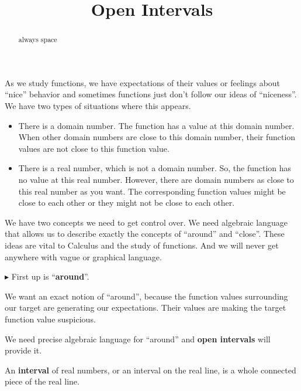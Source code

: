 \documentclass{ximera}
\title{Open Intervals}
\begin{document}
\begin{abstract}
always space
\end{abstract}
\maketitle




As we study functions, we have expectations of their values or feelings about ``nice'' behavior and sometimes functions just don't follow our ideas of ``niceness''.  We have two types of situations where this appears.

\begin{itemize}
\item There is a domain number. The function has a value at this domain number. When other domain numbers are close to this domain number, their function values are not close to this function value.
\item There is a real number, which is not a domain number. So, the function has no value at this real number. However, there are domain numbers as close to this real number as you want. The corresponding function values might be close to each other or they might not be close to each other.
\end{itemize}


We have two concepts we need to get control over. We need algebraic language that allows us to describe exactly the concepts of ``around'' and ``close''.  These ideas are vital to Calculus and the study of functions.  And we will never get anywhere with vague or graphical language.


\textbf{\textcolor{red!70!darkgray}{$\blacktriangleright$}} First up is ``\textbf{\textcolor{purple!85!blue}{around}}''.



We want an exact notion of ``around'', because the function values surrounding our target are generating our expectations.  Their values are making the target function value suspicious.

We need precise algebraic language for ``around'' and \textbf{open intervals} will provide it.















An \textbf{interval} of real numbers, or an interval on the real line, is a whole connected piece of the real line.
\end{document}
